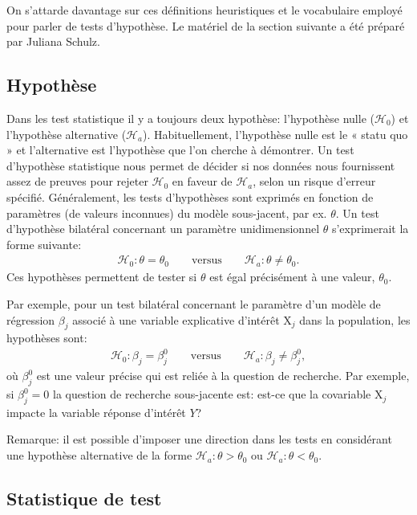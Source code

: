 \documentclass[
  11pt,
  letterpaper,
]{book}
\begin{document}
On s'attarde davantage sur ces définitions heuristiques et le vocabulaire employé pour parler de tests d'hypothèse. Le matériel de la section suivante a été préparé par Juliana Schulz.

\hypertarget{hypothuxe8se}{%
\subsection{Hypothèse}\label{hypothuxe8se}}

Dans les test statistique il y a toujours deux hypothèse: l'hypothèse nulle (\(\mathscr{H}{}_{0}\)) et l'hypothèse alternative (\(\mathscr{H}_a\)). Habituellement, l'hypothèse nulle est le « statu quo » et l'alternative est l'hypothèse que l'on cherche à démontrer. Un test d'hypothèse statistique nous permet de décider si nos données nous fournissent assez de preuves pour rejeter \(\mathscr{H}_0\) en faveur de \(\mathscr{H}_a\), selon un risque d'erreur spécifié. Généralement, les tests d'hypothèses sont exprimés en fonction de paramètres (de valeurs inconnues) du modèle sous-jacent, par ex. \(\theta\). Un test d'hypothèse bilatéral concernant un paramètre unidimensionnel \(\theta\) s'exprimerait la forme suivante:
\begin{align*}
\mathscr{H}_0: \theta=\theta_0 \qquad \text{versus} \qquad \mathscr{H}_a:\theta \neq \theta_0.
\end{align*}
Ces hypothèses permettent de tester si \(\theta\) est égal précisément à une valeur, \(\theta_0\).

Par exemple, pour un test bilatéral concernant le paramètre d'un modèle de régression \(\beta_j\) associé à une variable explicative d'intérêt \(\mathrm{X}_j\) dans la population, les hypothèses sont:
\begin{align*}
\mathscr{H}_0: \beta_j=\beta_j^0 \qquad \text{versus} \qquad \mathscr{H}_a:\beta_j \neq \beta_j^0, 
\end{align*}
où \(\beta_j^0\) est une valeur précise qui est reliée à la question de recherche. Par exemple, si \(\beta_j^0=0\) la question de recherche sous-jacente est: est-ce que la covariable \(\mathrm{X}_j\) impacte la variable réponse d'intérêt \(Y\)?

Remarque: il est possible d'imposer une direction dans les tests en considérant une hypothèse alternative de la forme \(\mathscr{H}_a: \theta > \theta_0\) ou \(\mathscr{H}_a: \theta < \theta_0\).

\hypertarget{statistique-de-test}{%
\subsection{Statistique de test}\label{statistique-de-test}}
\end{document}
